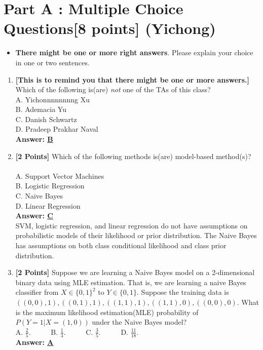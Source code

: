 \documentclass{article}
\begin{document}
\newpage


\section*{Part A : Multiple Choice Questions[8 points] (Yichong)}

\begin{itemize}
	\item \textbf{There might be one or more right answers}. Please explain your choice in one or two sentences.
\end{itemize}

\vspace {2mm}

\begin{enumerate}

		\item \textbf{[This is to remind you that there might be one or more answers.]} Which of the following is(are) \emph{not} one of the TAs of this class?\\
		A. Yichonnnnnnnng Xu\\
		B. Ademacia Yu\\
		C. Danish Schwartz\\
		D. Pradeep Prakhar Naval\\		
		\textbf{Answer: \underline{B}}

		\item \textbf{[2 Points]} Which of the following methods is(are) model-based method(s)? \\ \\
		A. Support Vector Machines \\
		B. Logistic Regression\\
		C. Naive Bayes\\
		D. Linear Regression\\
		\textbf{Answer: \underline{C}}\\
		SVM, logistic regression, and linear regression do not have assumptions on probabilistic models of their likelihood or prior distribution. The Naive Bayes has assumptions on both class conditional likelihood and class prior distribution.

		\item \textbf{[2 Points]} Suppose we are learning a Naive Bayes model on a 2-dimensional binary data using MLE estimation. That is, we are learning a naive Bayes classifier from $X\in \{0,1\}^2$ to $Y\in \{0,1\}$. Suppose the training data is $((0,0),1), ((0,1),1),((1,1),1),((1,1),0),((0,0),0)$. What is the maximum likelihood estimation(MLE) probability of $P(Y=1|X=(1,0))$ under the Naive Bayes model?\\
		A. $\frac{2}{5}$. \ \ \ \ \  B. $\frac{1}{3}$. \ \ \ \ \  C. $\frac{3}{5}$. \ \ \ \ \ D. $\frac{11}{18}$.
		\\
		\textbf{Answer: \underline{A}}
		

\end{enumerate}
\end{document}

